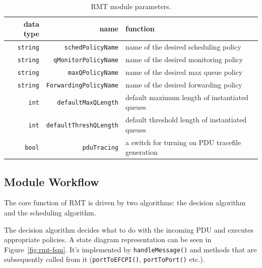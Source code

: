             \begin{table}[H]
                \begin{center}
                  \begin{tabular}{ | r | r | l | }
                    \hline
                    data type & name & function \\
                    \hline
                    \texttt{string} & \texttt{schedPolicyName} & name of the desired scheduling policy \\
                    \texttt{string} & \texttt{qMonitorPolicyName} & name of the desired monitoring policy \\
                    \texttt{string} & \texttt{maxQPolicyName} & name of the desired max queue policy \\
                    \texttt{string} & \texttt{ForwardingPolicyName} & name of the desired forwarding policy \\
                    \texttt{int} & \texttt{defaultMaxQLength} & default maximum length of instantiated queues \\
                    \texttt{int} & \texttt{defaultThreshQLength} & default threshold length of instantiated queues \\
                    \texttt{bool} & \texttt{pduTracing} & a switch for turning on PDU tracefile generation \\
                    \hline
                  \end{tabular}
                  \caption{RMT module parameters.}
                  \label{fig:rmt_params}
                \end{center}
            \end{table}

        \subsection{Module Workflow}

            The core function of RMT is driven by two algorithms: the decision algorithm and the scheduling algorithm.

            The decision algorithm decides what to do with the incoming PDU and executes appropriate policies. A state diagram representation can be seen in Figure~\ref{fig:rmt-fsm}. It's implemented by \texttt{handleMessage()} and methods that are subsequently called from it (\texttt{portToEFCPI()}, \texttt{portToPort()} etc.).

